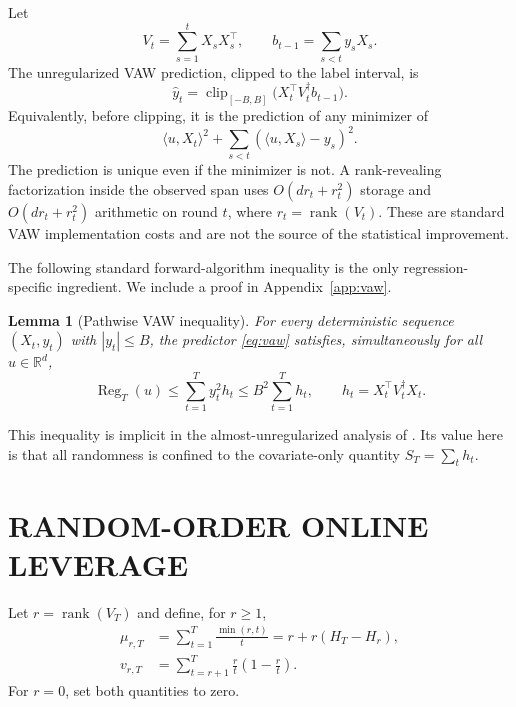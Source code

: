 \documentclass[twoside]{article}
\newtheorem{lemma}[theorem]{Lemma}
\newcommand{\R}{\mathbb R}
\newcommand{\clip}{\operatorname{clip}}
\newcommand{\rank}{\operatorname{rank}}
\newcommand{\Reg}{\operatorname{Reg}}
\begin{document}
Let \[ V_t=\sum_{s=1}^tX_sX_s^\top, \qquad b_{t-1}=\sum_{s<t}y_sX_s. \] The unregularized VAW prediction, clipped to the label interval, is
\begin{equation}
 \widehat y_t=\clip_{[-B,B]}\bigl(X_t^\top V_t^\dagger b_{t-1}\bigr).
 \label{eq:vaw}
\end{equation}
Equivalently, before clipping, it is the prediction of any minimizer of \[ \langle u,X_t\rangle^2+ \sum_{s<t}(\langle u,X_s\rangle-y_s)^2. \] The prediction is unique even if the minimizer is not. A rank-revealing factorization inside the observed span uses $O(dr_t+r_t^2)$ storage and $O(dr_t+r_t^2)$ arithmetic on round $t$, where $r_t=\rank(V_t)$. These are standard VAW implementation costs and are not the source of the statistical improvement.

The following standard forward-algorithm inequality is the only regression-specific ingredient. We include a proof in Appendix~\ref{app:vaw}.

\begin{lemma}[Pathwise VAW inequality]
\label{lem:vaw}
For every deterministic sequence $(X_t,y_t)$ with $|y_t|\le B$, the predictor \eqref{eq:vaw} satisfies, simultaneously for all $u\in\R^d$,
\begin{equation}
 \Reg_T(u)\le \sum_{t=1}^T y_t^2h_t
 \le B^2\sum_{t=1}^Th_t,
 \qquad h_t=X_t^\top V_t^\dagger X_t.
 \label{eq:vaw-bound}
\end{equation}
\end{lemma}

This inequality is implicit in the almost-unregularized analysis of \citet[Theorem 11]{gaillard2019uniform}. Its value here is that all randomness is confined to the covariate-only quantity $S_T=\sum_t h_t$.

\section{RANDOM-ORDER ONLINE LEVERAGE}
\label{sec:leverage}

Let $r=\rank(V_T)$ and define, for $r\ge1$,
\begin{align}
 \mu_{r,T}&=\sum_{t=1}^T\frac{\min(r,t)}t
 =r+r(H_T-H_r),
 \label{eq:mu}\\
 v_{r,T}&=\sum_{t=r+1}^T\frac rt\left(1-\frac rt\right).
 \label{eq:variance}
\end{align}
For $r=0$, set both quantities to zero.
\end{document}
